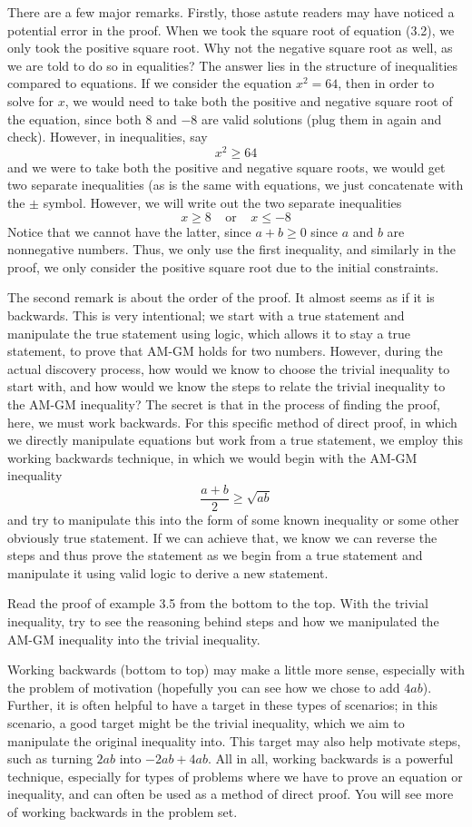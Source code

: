 There are a few major remarks. Firstly, those astute readers may have noticed a potential error in the proof. When we took the square root of equation (3.2), we only took the positive square root. Why not the negative square root as well, as we are told to do so in equalities? The answer lies in the structure of inequalities compared to equations. If we consider the equation $x^2 = 64$, then in order to solve for $x$, we would need to take both the positive and negative square root of the equation, since both $8$ and $-8$ are valid solutions (plug them in again and check). However, in inequalities, say 
\[
x^2 \geq 64
\]
and we were to take both the positive and negative square roots, we would get two separate inequalities (as is the same with equations, we just concatenate with the $\pm$ symbol. However, we will write out the two separate inequalities
\[
x \geq 8 ~~~~~ \text{or}~~~~~ x \leq -8
\]
Notice that we cannot have the latter, since $a + b \geq 0$ since $a$ and $b$ are nonnegative numbers. Thus, we only use the first inequality, and similarly in the proof, we only consider the positive square root due to the initial constraints. 

The second remark is about the order of the proof. It almost seems as if it is backwards. This is very intentional; we start with a true statement and manipulate the true statement using logic, which allows it to stay a true statement, to prove that AM-GM holds for two numbers. However, during the actual discovery process, how would we know to choose the trivial inequality to start with, and how would we know the steps to relate the trivial inequality to the AM-GM inequality? The secret is that in the process of finding the proof, here, we must work backwards. For this specific method of direct proof, in which we directly manipulate equations but work from a true statement, we employ this working backwards technique, in which we would begin with the AM-GM inequality 
\[
\frac{a + b}{2} \geq \sqrt{ab}
\]
and try to manipulate this into the form of some known inequality or some other obviously true statement. If we can achieve that, we know we can reverse the steps and thus prove the statement as we begin from a true statement and manipulate it using valid logic to derive a new statement.
\begin{exercise}
    Read the proof of example 3.5 from the bottom to the top. With the trivial inequality, try to see the reasoning behind steps and how we manipulated the AM-GM inequality into the trivial inequality. 
\end{exercise}
Working backwards (bottom to top) may make a little more sense, especially with the problem of motivation (hopefully you can see how we chose to add $4ab$). Further, it is often helpful to have a target in these types of scenarios; in this scenario, a good target might be the trivial inequality, which we aim to manipulate the original inequality into. This target may also help motivate steps, such as turning $2ab$ into $-2ab + 4ab$. All in all, working backwards is a powerful technique, especially for types of problems where we have to prove an equation or inequality, and can often be used as a method of direct proof. You will see more of working backwards in the problem set.

